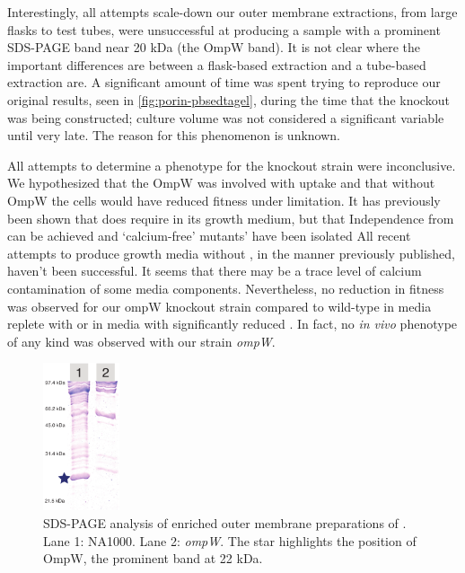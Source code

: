 Interestingly, all attempts scale-down our outer membrane extractions, from large flasks to test tubes, were unsuccessful at producing a sample with a prominent \ac{SDS-PAGE} band near 20 kDa (the OmpW band). It is not clear where the important differences are between a flask-based extraction and a tube-based extraction are. A significant amount of time was spent trying to reproduce our original results, seen in \cref{fig:porin-pbsedtagel}, during the time that the knockout was being constructed; culture volume was not considered a significant variable until very late. The reason for this phenomenon is unknown.

All attempts to determine a phenotype for the knockout strain were inconclusive. We hypothesized that the OmpW was involved with  uptake and that without OmpW the cells would have reduced fitness under  limitation. It has previously been shown that \caulobacter does require  in its growth medium, but that Independence from  can be achieved and  `calcium-free' mutants' have been isolated All recent attempts to produce growth media without , in the manner previously published, haven't been successful. It seems that there may be a trace level of calcium contamination of some media components. Nevertheless, no reduction in fitness was observed for our ompW knockout strain compared to wild-type in media replete with  or in media with significantly reduced . In fact, no \textit{in vivo} phenotype of any kind was observed with our strain \caulobacter \del \textit{ompW}.

\begin{figure}[htb]
  	\begin{center}
   		\includegraphics[width=0.2\textwidth]{porin_chapter/img/Fig-knockout.pdf}
   	\end{center}
   	\caption[\ac{SDS-PAGE} of \caulobacter \del \textit{ompW}]{\ac{SDS-PAGE} analysis of enriched outer membrane preparations of \caulobacter. Lane 1: \caulobacter NA1000. Lane 2: \caulobacter  \del \textit{ompW}. The star highlights the position of OmpW, the prominent band at 22 kDa. 
   	}
   	\label{fig:porinknockout}
\end{figure}   

